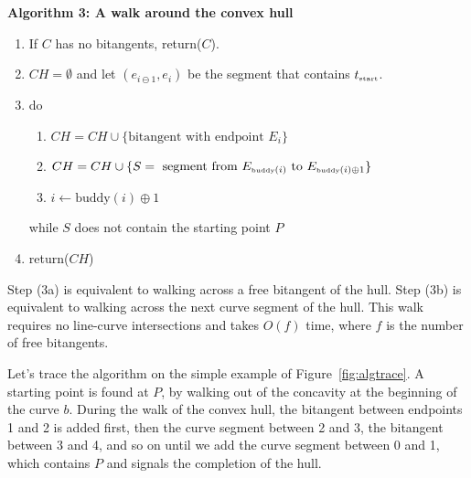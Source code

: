 \documentclass[11pt]{article}
\begin{document}

\clearpage

\centerline{{\bf Algorithm 3: A walk around the convex hull}}

\begin{enumerate}
\item 	If $C$ has no bitangents, return($C$).
\item   $CH = \emptyset$ and let 
        $(e_{i \ominus 1},e_i)$ be the segment that contains $t_{\mbox{\tiny{start}}}$.
\item	do
\begin{enumerate}
\item	$CH = CH \cup \{\mbox{bitangent with endpoint $E_i$}\} $
\item	$CH = CH \cup \{ S = \mbox{ segment from } E_{\mbox{\tiny{buddy}}(i)} \mbox{ to }  
  E_{\mbox{\tiny{buddy}}(i) \oplus 1} \}$
\item	$i \leftarrow \mbox{buddy}(i) \oplus 1$
\end{enumerate}
 	while $S$ does not contain the starting point $P$
\item return($CH$)
\end{enumerate}

Step (3a) is equivalent to walking across a free bitangent of the hull.
Step (3b) is equivalent to walking across the next curve segment of the hull.
This walk requires no line-curve intersections and takes $O(f)$ time, 
where $f$ is the number of free bitangents.

\begin{example}
Let's trace the algorithm on the simple example of Figure~\ref{fig:algtrace}.
A starting point is found at $P$, by walking out of the concavity
at the beginning of the curve $b$.
During the walk of the convex hull, 
the bitangent between endpoints 1 and 2 is added first,
then the curve segment between 2 and 3, the bitangent between 3 and 4,
and so on until we add the curve segment between 0 and 1,
which contains $P$ and signals the completion of the hull.
\end{example}
\end{document}
